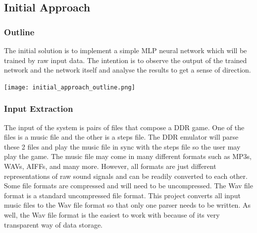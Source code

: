 \subsection{Initial Approach}
\subsubsection{Outline}

The initial solution is to implement a simple MLP neural network which will be trained by raw input data. The intention is to observe the output of the trained network and the network itself and analyse the results to get a sense of direction.

\texttt{[image: initial\_approach\_outline.png]}

\subsubsection{Input Extraction}

The input of the system is pairs of files that compose a DDR game. One of the files is a music file and the other is a steps file. The DDR emulator will parse these 2 files and play the music file in sync with the steps file so the user may play the game.
The music file may come in many different formats such as MP3s, WAVs, AIFFs, and many more. However, all formats are just different representations of raw sound signals and can be readily converted to each other. Some file formats are compressed and will need to be uncompressed. The Wav file format is a standard uncompressed file format. This project converts all input music files to the Wav file format so that only one parser needs to be written. As well, the Wav file format is the easiest to work with because of its very transparent way of data storage.\\

